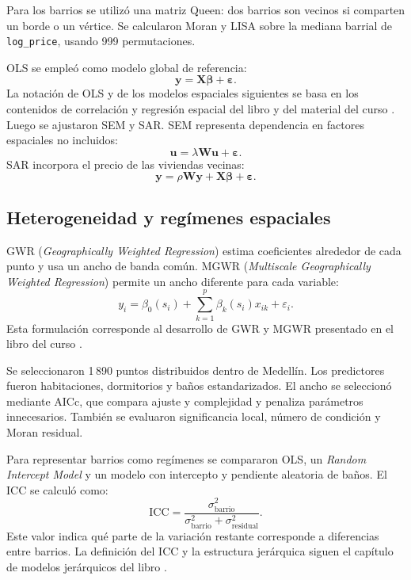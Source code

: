 \documentclass[conference]{IEEEtran}
\begin{document}
Para los barrios se utilizó una matriz Queen: dos barrios son vecinos si comparten un borde o un vértice. Se calcularon Moran y LISA sobre la mediana barrial de \texttt{log\_price}, usando 999 permutaciones.

OLS se empleó como modelo global de referencia:
\begin{equation*}
    \mathbf{y}=\mathbf{X}\boldsymbol{\beta}+\boldsymbol{\varepsilon}.
\end{equation*}
La notación de OLS y de los modelos espaciales siguientes se basa en los contenidos de correlación y regresión espacial del libro y del material del curso \cite{librocurso,materialcurso}.
Luego se ajustaron SEM y SAR. SEM representa dependencia en factores espaciales no incluidos:
\begin{equation*}
    \mathbf{u}=\lambda\mathbf{W}\mathbf{u}+\boldsymbol{\varepsilon}.
\end{equation*}
SAR incorpora el precio de las viviendas vecinas:
\begin{equation*}
    \mathbf{y}=\rho\mathbf{W}\mathbf{y}
    +\mathbf{X}\boldsymbol{\beta}+\boldsymbol{\varepsilon}.
\end{equation*}

\subsection{Heterogeneidad y regímenes espaciales}

GWR (\emph{Geographically Weighted Regression}) estima coeficientes alrededor de cada punto y usa un ancho de banda común. MGWR (\emph{Multiscale Geographically Weighted Regression}) permite un ancho diferente para cada variable:
\begin{equation*}
    y_i=\beta_0(s_i)+\sum_{k=1}^{p}\beta_k(s_i)x_{ik}+\varepsilon_i.
\end{equation*}
Esta formulación corresponde al desarrollo de GWR y MGWR presentado en el libro del curso \cite{librocurso}.

Se seleccionaron 1\,890 puntos distribuidos dentro de Medellín. Los predictores fueron habitaciones, dormitorios y baños estandarizados. El ancho se seleccionó mediante AICc, que compara ajuste y complejidad y penaliza parámetros innecesarios. También se evaluaron significancia local, número de condición y Moran residual.

Para representar barrios como regímenes se compararon OLS, un \emph{Random Intercept Model} y un modelo con intercepto y pendiente aleatoria de baños. El ICC se calculó como:
\begin{equation*}
    \mathrm{ICC}=
    \frac{\sigma^2_{\text{barrio}}}
    {\sigma^2_{\text{barrio}}+\sigma^2_{\text{residual}}}.
\end{equation*}
Este valor indica qué parte de la variación restante corresponde a diferencias entre barrios.
La definición del ICC y la estructura jerárquica siguen el capítulo de modelos jerárquicos del libro \cite{librocurso}.
\end{document}
